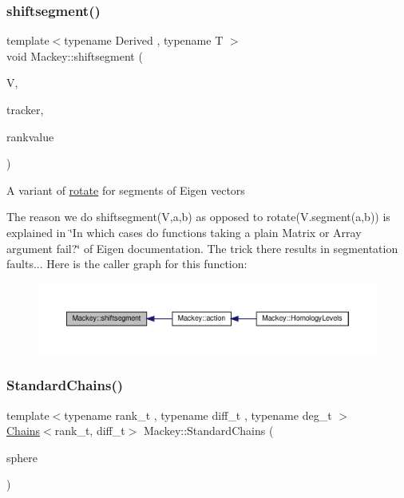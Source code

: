 \subsubsection{\texorpdfstring{shiftsegment()}{shiftsegment()}}
{\footnotesize\ttfamily template$<$typename Derived , typename T $>$ \\
void Mackey\+::shiftsegment (\begin{DoxyParamCaption}\item[{Eigen\+::\+Matrix\+Base$<$ Derived $>$ \&}]{V,  }\item[{int}]{tracker,  }\item[{T}]{rankvalue }\end{DoxyParamCaption})}

A variant of \hyperlink{namespaceMackey_a38a833de54971845cbdb8c96f830725b}{rotate} for segments of Eigen vectors

The reason we do shiftsegment(\+V,a,b) as opposed to rotate(V.\+segment(a,b)) is explained in \char`\"{}\+In which cases do functions taking a plain Matrix or Array argument fail?\char`\"{} of Eigen documentation. The trick there results in segmentation faults... Here is the caller graph for this function\+:\nopagebreak
\begin{figure}[H]
\begin{center}
\leavevmode
\includegraphics[width=350pt]{namespaceMackey_aab8a6292210a3b71960cb03b79d218e6_icgraph}
\end{center}
\end{figure}
\mbox{\label{namespaceMackey_a425b988266cedec0299fb539d99179b1}} 
\subsubsection{\texorpdfstring{Standard\+Chains()}{StandardChains()}\hspace{0.1cm}{\footnotesize\ttfamily [1/2]}}
{\footnotesize\ttfamily template$<$typename rank\+\_\+t , typename diff\+\_\+t , typename deg\+\_\+t $>$ \\
\hyperlink{classMackey_1_1Chains}{Chains}$<$rank\+\_\+t, diff\+\_\+t$>$ Mackey\+::\+Standard\+Chains (\begin{DoxyParamCaption}\item[{const deg\+\_\+t \&}]{sphere }\end{DoxyParamCaption})}




